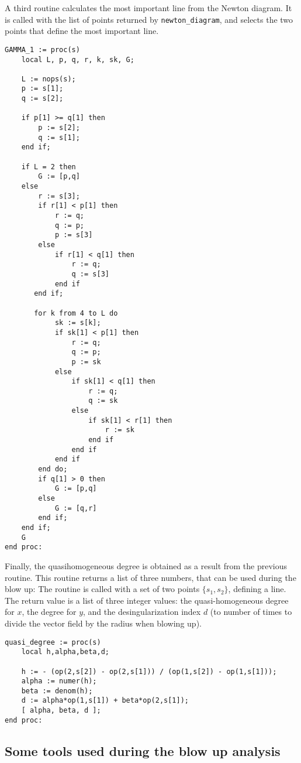 \documentclass[a4paper,10pt]{article}
\begin{document}
A third routine calculates the most important line from the Newton diagram.  It is
called with the list of points returned by \verb+newton_diagram+, and selects the
two points that define the most important line.

\begin{lstlisting}[name=blowup]
GAMMA_1 := proc(s)
    local L, p, q, r, k, sk, G;

    L := nops(s);
    p := s[1];
    q := s[2];

    if p[1] >= q[1] then
        p := s[2];
        q := s[1];
    end if;

    if L = 2 then
        G := [p,q]
    else
        r := s[3];
        if r[1] < p[1] then
            r := q;
            q := p;
            p := s[3]
        else
            if r[1] < q[1] then
                r := q;
                q := s[3]
            end if
       end if;

       for k from 4 to L do
            sk := s[k];
            if sk[1] < p[1] then
                r := q;
                q := p;
                p := sk
            else
                if sk[1] < q[1] then
                    r := q;
                    q := sk
                else
                    if sk[1] < r[1] then
                        r := sk
                    end if
                end if
            end if
        end do;
        if q[1] > 0 then
            G := [p,q]
        else
            G := [q,r]
        end if;
    end if;
    G
end proc:
\end{lstlisting}

Finally, the quasihomogeneous degree is obtained as a result from the previous routine.
This routine returns a list of three numbers, that can be used during the blow up:
The routine is called with a set of two points $\{s_1,s_2\}$, defining a line.  The return
value is a list of three integer values: the quasi-homogeneous degree for $x$, the degree for $y$,
and the desingularization index $d$ (to number of times to divide the vector field by the radius when
blowing up).

\begin{lstlisting}[name=blowup]
quasi_degree := proc(s)
    local h,alpha,beta,d;

    h := - (op(2,s[2]) - op(2,s[1])) / (op(1,s[2]) - op(1,s[1]));
    alpha := numer(h);
    beta := denom(h);
    d := alpha*op(1,s[1]) + beta*op(2,s[1]);
    [ alpha, beta, d ];
end proc:
\end{lstlisting}

\subsection{Some tools used during the blow up analysis}
\end{document}
